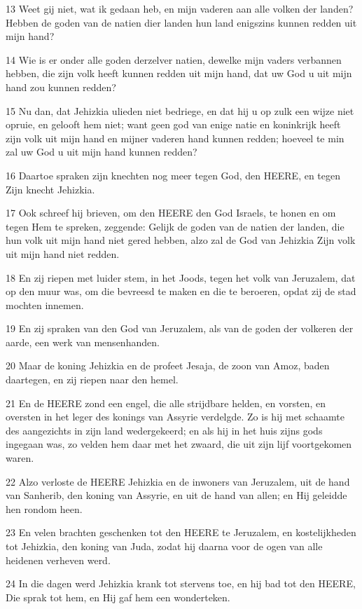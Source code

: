 \par 13 Weet gij niet, wat ik gedaan heb, en mijn vaderen aan alle volken der landen? Hebben de goden van de natien dier landen hun land enigszins kunnen redden uit mijn hand?
\par 14 Wie is er onder alle goden derzelver natien, dewelke mijn vaders verbannen hebben, die zijn volk heeft kunnen redden uit mijn hand, dat uw God u uit mijn hand zou kunnen redden?
\par 15 Nu dan, dat Jehizkia ulieden niet bedriege, en dat hij u op zulk een wijze niet opruie, en gelooft hem niet; want geen god van enige natie en koninkrijk heeft zijn volk uit mijn hand en mijner vaderen hand kunnen redden; hoeveel te min zal uw God u uit mijn hand kunnen redden?
\par 16 Daartoe spraken zijn knechten nog meer tegen God, den HEERE, en tegen Zijn knecht Jehizkia.
\par 17 Ook schreef hij brieven, om den HEERE den God Israels, te honen en om tegen Hem te spreken, zeggende: Gelijk de goden van de natien der landen, die hun volk uit mijn hand niet gered hebben, alzo zal de God van Jehizkia Zijn volk uit mijn hand niet redden.
\par 18 En zij riepen met luider stem, in het Joods, tegen het volk van Jeruzalem, dat op den muur was, om die bevreesd te maken en die te beroeren, opdat zij de stad mochten innemen.
\par 19 En zij spraken van den God van Jeruzalem, als van de goden der volkeren der aarde, een werk van mensenhanden.
\par 20 Maar de koning Jehizkia en de profeet Jesaja, de zoon van Amoz, baden daartegen, en zij riepen naar den hemel.
\par 21 En de HEERE zond een engel, die alle strijdbare helden, en vorsten, en oversten in het leger des konings van Assyrie verdelgde. Zo is hij met schaamte des aangezichts in zijn land wedergekeerd; en als hij in het huis zijns gods ingegaan was, zo velden hem daar met het zwaard, die uit zijn lijf voortgekomen waren.
\par 22 Alzo verloste de HEERE Jehizkia en de inwoners van Jeruzalem, uit de hand van Sanherib, den koning van Assyrie, en uit de hand van allen; en Hij geleidde hen rondom heen.
\par 23 En velen brachten geschenken tot den HEERE te Jeruzalem, en kostelijkheden tot Jehizkia, den koning van Juda, zodat hij daarna voor de ogen van alle heidenen verheven werd.
\par 24 In die dagen werd Jehizkia krank tot stervens toe, en hij bad tot den HEERE, Die sprak tot hem, en Hij gaf hem een wonderteken.
